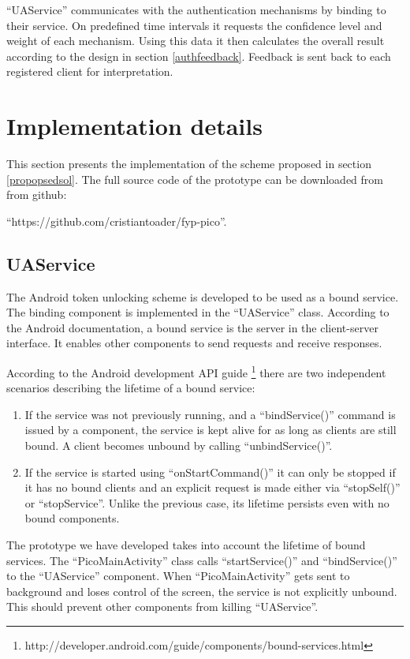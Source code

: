 ``UAService'' communicates with the authentication mechanisms by binding to their service. On predefined time intervals it requests the confidence level and weight of each mechanism. Using this data it then calculates the overall result according to the design in section \ref{authfeedback}. Feedback is sent back to each registered client for interpretation.

\section{Implementation details}
This section presents the implementation of the scheme proposed in section \ref{propopsedsol}. The full source code of the prototype can be downloaded from from github: 

``https://github.com/cristiantoader/fyp-pico''.

\subsection{UAService}
The Android token unlocking scheme is developed to be used as a bound service. The binding component is implemented in the ``UAService'' class. According to the Android documentation, a bound service is the server in the client-server interface. It enables other components to send requests and receive responses.

According to the Android development API guide \footnote{http://developer.android.com/guide/components/bound-services.html} there are two independent scenarios describing the lifetime of a bound service:
\begin{enumerate}
	\item If the service was not previously running, and a ``bindService()'' command is issued by a component, the service is kept alive for as long as clients are still bound. A client becomes unbound by calling ``unbindService()''.
	
	\item If the service is started using ``onStartCommand()'' it can only be stopped if it has no bound clients and an explicit request is made either via ``stopSelf()'' or ``stopService''. Unlike the previous case, its lifetime persists even with no bound components.
\end{enumerate}

The prototype we have developed takes into account the lifetime of bound services. The ``PicoMainActivity'' class calls ``startService()'' and ``bindService()'' to the ``UAService'' component. When ``PicoMainActivity'' gets sent to background and loses control of the screen, the service is not explicitly unbound. This should prevent other components from killing ``UAService''. 

